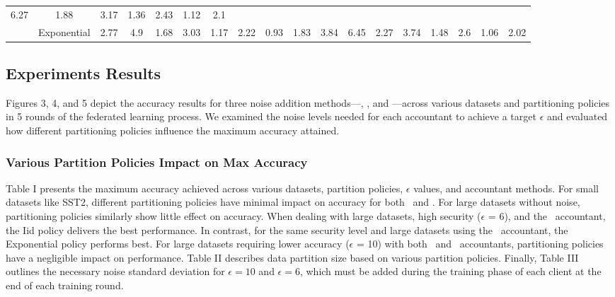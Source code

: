 \begin{table*}[t]
{\begin{tabular}{|c|c|cccccccc|cccccccc|}
  \multicolumn{1}{c|}{6.27} &
  \multicolumn{1}{c|}{1.88} &
  \multicolumn{1}{c|}{3.17} &
  \multicolumn{1}{c|}{1.36} &
  \multicolumn{1}{c|}{2.43} &
  \multicolumn{1}{c|}{1.12} &
  2.1 \\
 &
  Exponential &
  \multicolumn{1}{c|}{2.77} &
  \multicolumn{1}{c|}{4.9} &
  \multicolumn{1}{c|}{1.68} &
  \multicolumn{1}{c|}{3.03} &
  \multicolumn{1}{c|}{1.17} &
  \multicolumn{1}{c|}{2.22} &
  \multicolumn{1}{c|}{0.93} &
  1.83 &
  \multicolumn{1}{c|}{3.84} &
  \multicolumn{1}{c|}{6.45} &
  \multicolumn{1}{c|}{2.27} &
  \multicolumn{1}{c|}{3.74} &
  \multicolumn{1}{c|}{1.48} &
  \multicolumn{1}{c|}{2.6} &
  \multicolumn{1}{c|}{1.06} &
  2.02 \\ \hline
\end{tabular}%
}
\end{table*}
\subsection{Experiments Results}
Figures 3, 4, and 5 depict the accuracy results for three noise addition methods—\nonoise, \sys, and \rdp—across various datasets and partitioning policies in 5 rounds of the federated learning process. We examined the noise levels needed for each accountant to achieve a target \( \epsilon \) and evaluated how different partitioning policies influence the maximum accuracy attained.
\subsubsection{Various Partition Policies Impact on Max Accuracy}Table I presents the maximum accuracy achieved across various datasets, partition policies, \( \epsilon\) values, and accountant methods.
For small datasets like SST2, different partitioning policies have minimal impact on accuracy for both \rdp~and \sys.  
For large datasets without noise, partitioning policies similarly show little effect on accuracy.  
When dealing with large datasets, high security (\( \epsilon\) = 6), and the \sys~accountant, the Iid policy delivers the best performance.  
In contrast, for the same security level and large datasets using the \rdp~accountant, the Exponential policy performs best.  
For large datasets requiring lower accuracy (\( \epsilon\) = 10) with both \sys~and \rdp~accountants, partitioning policies have a negligible impact on performance.
Table II describes data partition size based on various partition policies. Finally, Table III outlines the necessary noise standard deviation for \( \epsilon = 10 \) and \( \epsilon = 6 \), which must be added during the training phase of each client at the end of each training round.
